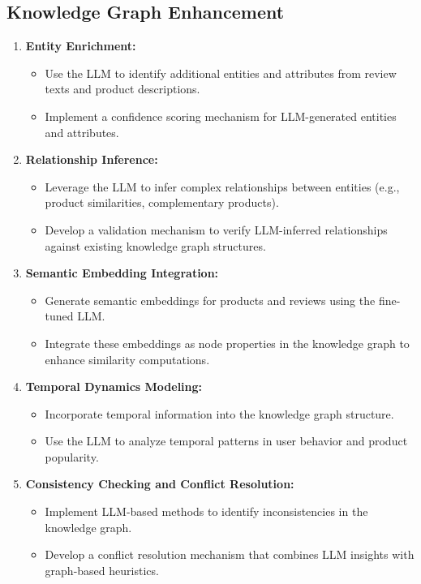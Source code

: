 \documentclass{article}
\begin{document}
\subsection{Knowledge Graph Enhancement}
\begin{enumerate}
    \item \textbf{Entity Enrichment:}
    \begin{itemize}
        \item Use the LLM to identify additional entities and attributes from review texts and product descriptions.
        \item Implement a confidence scoring mechanism for LLM-generated entities and attributes.
    \end{itemize}
    
    \item \textbf{Relationship Inference:}
    \begin{itemize}
        \item Leverage the LLM to infer complex relationships between entities (e.g., product similarities, complementary products).
        \item Develop a validation mechanism to verify LLM-inferred relationships against existing knowledge graph structures.
    \end{itemize}
    
    \item \textbf{Semantic Embedding Integration:}
    \begin{itemize}
        \item Generate semantic embeddings for products and reviews using the fine-tuned LLM.
        \item Integrate these embeddings as node properties in the knowledge graph to enhance similarity computations.
    \end{itemize}
    
    \item \textbf{Temporal Dynamics Modeling:}
    \begin{itemize}
        \item Incorporate temporal information into the knowledge graph structure.
        \item Use the LLM to analyze temporal patterns in user behavior and product popularity.
    \end{itemize}
    
    \item \textbf{Consistency Checking and Conflict Resolution:}
    \begin{itemize}
        \item Implement LLM-based methods to identify inconsistencies in the knowledge graph.
        \item Develop a conflict resolution mechanism that combines LLM insights with graph-based heuristics.
    \end{itemize}
\end{enumerate}
\end{document}
